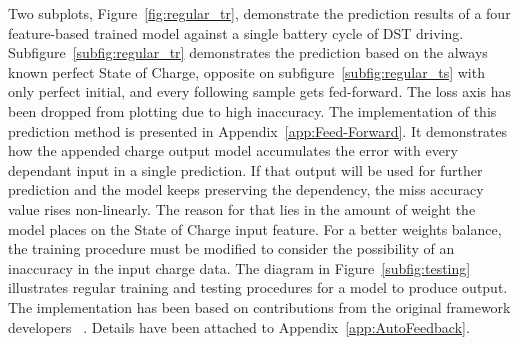 %
%
Two subplots, \mbox{Figure~\ref{fig:regular_tr}}, demonstrate the prediction results of a four feature-based trained model against a single battery cycle of DST driving.
\mbox{Subfigure~\ref{subfig:regular_tr}} demonstrates the prediction based on the always known perfect State of Charge, opposite on \mbox{subfigure~\ref{subfig:regular_ts}} with only perfect initial, and every following sample gets fed-forward.
The loss axis has been dropped from plotting due to high inaccuracy.
The implementation of this prediction method is presented in \mbox{Appendix~\ref{app:Feed-Forward}}.
It demonstrates how the appended charge output model accumulates the error with every dependant input in a single prediction.
If that output will be used for further prediction and the model keeps preserving the dependency, the miss accuracy value rises non-linearly.
The reason for that lies in the amount of weight the model places on the State of Charge input feature.
For a better weights balance, the training procedure must be modified to consider the possibility of an inaccuracy in the input charge data.
The diagram in \mbox{Figure~\ref{subfig:testing}} illustrates regular training and testing procedures for a model to produce output.
The implementation has been based on contributions from the original framework developers ~\cite{time_2020}.
Details have been attached to Appendix~\ref{app:AutoFeedback}.
